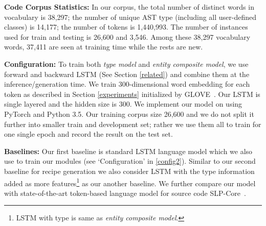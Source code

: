 \documentclass[11pt,a4paper]{article}
\begin{document}
\textbf{Code Corpus Statistics:} \label{stat_code} 
 In our corpus, the total number of distinct words in vocabulary is 38,297; the number of unique AST type (including all user-defined classes) is 14,177; the number of tokens is  1,440,993. The number of instances used for train and testing is 26,600 and 3,546. Among these 38,297 vocabulary words, 37,411 are seen at training time while the rests are new. 


\textbf{Configuration:} \label{config2}
To train both {\it type} {\it model} and {\it entity composite model}, we use forward and backward LSTM (See Section \ref{related}) and combine them at the inference/generation time. We train 300-dimensional word embedding for each token as described in Section \ref{experiments} initialized by GLOVE~\cite{glove}. Our LSTM is single layered and the hidden size is 300. We implement our model on using PyTorch and Python 3.5. 
Our training corpus size 26,600 and we do not split it further into smaller train and development set; rather we use them all to train for one single epoch and record the result on the test set.




\textbf{Baselines:} 
Our  first baseline is standard LSTM language model which we also use to train our modules (see `Configuration' in \ref{config2}).  Similar to our second baseline for recipe generation we also consider LSTM with the type information added as more features\footnote{LSTM with type is same as {\it entity composite  model}.} as our another baseline. We further compare our model with state-of-the-art token-based language model for source code SLP-Core~\cite{deep_net_for_source_code}.
\end{document}
